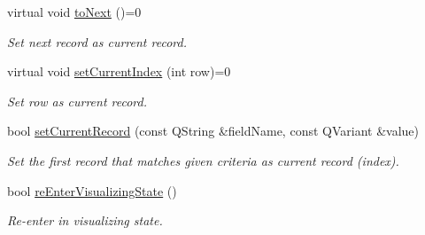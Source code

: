 \begin{DoxyCompactItemize}
virtual void \hyperlink{classmdt_abstract_sql_widget_a8ed6bb811c992fcc8bba8da9f675cd88}{to\-Next} ()=0
\begin{DoxyCompactList}\small\item\em Set next record as current record. \end{DoxyCompactList}\item 
virtual void \hyperlink{classmdt_abstract_sql_widget_a619725b15f305e216ba9ce9dc0ab9e3c}{set\-Current\-Index} (int row)=0
\begin{DoxyCompactList}\small\item\em Set row as current record. \end{DoxyCompactList}\item 
bool \hyperlink{classmdt_abstract_sql_widget_a49624704409e34459084201ccb8e9399}{set\-Current\-Record} (const Q\-String \&field\-Name, const Q\-Variant \&value)
\begin{DoxyCompactList}\small\item\em Set the first record that matches given criteria as current record (index). \end{DoxyCompactList}\item 
bool \hyperlink{classmdt_abstract_sql_widget_a434da68da8e11b0f25a4e3d2346c0373}{re\-Enter\-Visualizing\-State} ()
\begin{DoxyCompactList}\small\item\em Re-\/enter in visualizing state. \end{DoxyCompactList}\end{DoxyCompactItemize}
